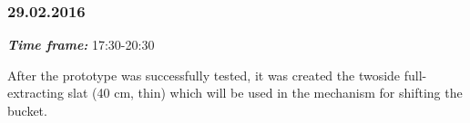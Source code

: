 \subsubsection{29.02.2016}
\textit{\textbf{Time frame:}} 17:30-20:30 

After the prototype was successfully tested, it was created the twoside full-extracting slat (40 cm, thin) which will be used in the mechanism for shifting the bucket. 
